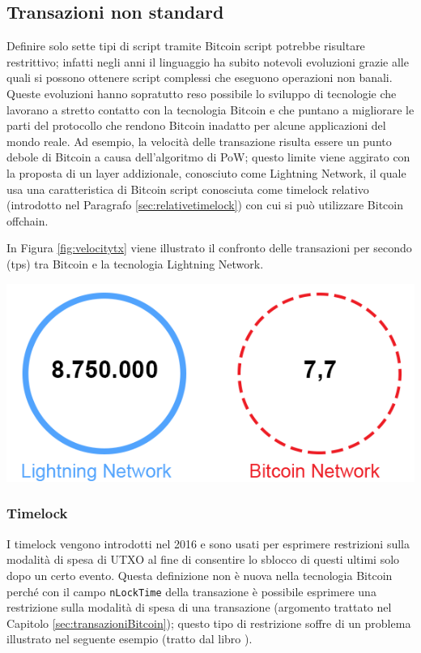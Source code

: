 \subsection{Transazioni non standard}
Definire solo sette tipi di script tramite Bitcoin script potrebbe risultare restrittivo; infatti negli anni il linguaggio ha subito notevoli evoluzioni grazie alle quali si possono ottenere script complessi che eseguono operazioni non banali. Queste evoluzioni hanno sopratutto reso possibile lo sviluppo di tecnologie che lavorano a stretto contatto con la tecnologia Bitcoin e che puntano a migliorare le parti del protocollo che rendono Bitcoin inadatto per alcune applicazioni del mondo reale. Ad esempio, la velocità delle transazione risulta essere un punto debole di Bitcoin a causa dell’algoritmo di PoW; questo limite viene aggirato con la proposta di un layer addizionale, conosciuto come Lightning Network, il quale usa una caratteristica di Bitcoin script conosciuta come timelock relativo (introdotto nel Paragrafo \ref{sec:relativetimelock}) con cui si può utilizzare Bitcoin offchain.

In Figura \ref{fig:velocitytx} viene illustrato il confronto delle transazioni per secondo (tps) tra Bitcoin e la tecnologia Lightning Network.

{\centering
\includegraphics[scale=1.2]{images/Lightning-Network-study.png}
\par}

\subsubsection{Timelock}

I timelock vengono introdotti nel 2016 e sono usati per esprimere restrizioni sulla modalità di spesa di UTXO al fine di consentire lo sblocco di questi ultimi solo dopo un certo evento. Questa definizione non è nuova nella tecnologia Bitcoin perché con il campo {\tt{nLockTime}} della transazione è possibile esprimere una restrizione sulla modalità di spesa di una transazione (argomento trattato nel Capitolo \ref{sec:transazioniBitcoin}); questo tipo di restrizione soffre di un problema illustrato nel seguente esempio (tratto dal libro \cite{bitcoinbook}).

